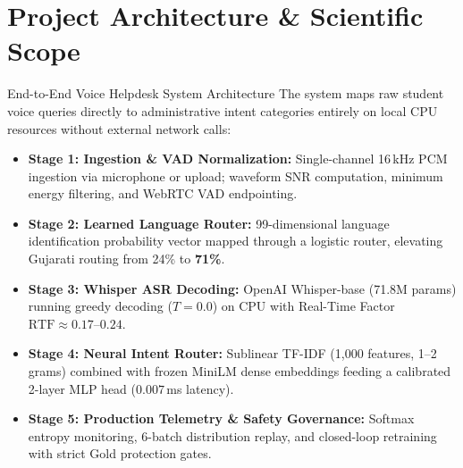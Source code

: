 \documentclass[10pt]{beamer}
\begin{document}
\section{Project Architecture \& Scientific Scope}

\begin{frame}{End-to-End Voice Helpdesk System Architecture}
    \footnotesize
    The system maps raw student voice queries directly to administrative intent categories entirely on local CPU resources without external network calls:\\[4pt]

    \begin{itemize}\setlength{\itemsep}{3pt}
        \item \textbf{Stage 1: Ingestion \& VAD Normalization:} Single-channel 16\,kHz PCM ingestion via microphone or upload; waveform SNR computation, minimum energy filtering, and WebRTC VAD endpointing.
        \item \textbf{Stage 2: Learned Language Router:} 99-dimensional language identification probability vector mapped through a logistic router, elevating Gujarati routing from 24\% to \textbf{71\%}.
        \item \textbf{Stage 3: Whisper ASR Decoding:} OpenAI Whisper-base (71.8M params) running greedy decoding ($T=0.0$) on CPU with Real-Time Factor $\text{RTF} \approx 0.17$--$0.24$.
        \item \textbf{Stage 4: Neural Intent Router:} Sublinear TF-IDF (1,000 features, 1--2 grams) combined with frozen MiniLM dense embeddings feeding a calibrated 2-layer MLP head ($0.007$\,ms latency).
        \item \textbf{Stage 5: Production Telemetry \& Safety Governance:} Softmax entropy monitoring, 6-batch distribution replay, and closed-loop retraining with strict Gold protection gates.
    \end{itemize}
\end{frame}
\end{document}
